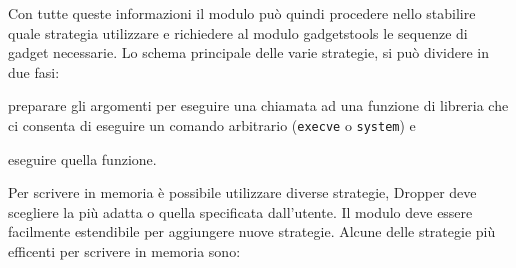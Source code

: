 Con tutte queste informazioni il modulo può quindi procedere nello
stabilire quale strategia utilizzare e richiedere al modulo
gadgetstools le sequenze di gadget necessarie. Lo schema principale
delle varie strategie, si può dividere in due fasi: 

\begin{inparaenum}[1)]
\item preparare gli argomenti per eseguire una chiamata ad una
  funzione di libreria che ci consenta di eseguire un comando
  arbitrario (\lstinline{execve} o \lstinline{system}) e
\item eseguire quella
funzione.
\end{inparaenum}

Per scrivere in memoria è possibile utilizzare diverse strategie,
Dropper deve scegliere la più adatta o quella specificata
dall'utente. Il modulo deve essere facilmente estendibile per
aggiungere nuove strategie. Alcune delle strategie più efficenti per
scrivere in memoria sono:

